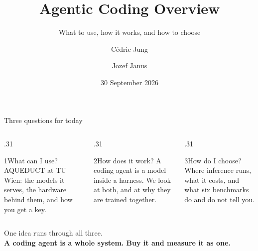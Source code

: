 \documentclass[aspectratio=169]{beamer}
\title{Agentic Coding Overview}
\subtitle{What to use, how it works, and how to choose}
\author{Cédric Jung \and Jozef Janus}
\date{30 September 2026}
\begin{document}
{%
\begin{frame}[plain]
  \titlepage
\end{frame}
}

\begin{frame}{Three questions for today}
\begin{columns}[T,onlytextwidth]
\begin{column}{.31\textwidth}
  \begin{block}{1\quad What can I use?}
  AQUEDUCT at TU Wien: the models it serves, the hardware behind them, and how you get a key.
  \end{block}
\end{column}
\hfill
\begin{column}{.31\textwidth}
  \begin{exampleblock}{2\quad How does it work?}
  A coding agent is a model inside a harness. We look at both, and at why they are trained together.
  \end{exampleblock}
\end{column}
\hfill
\begin{column}{.31\textwidth}
  \begin{block}{3\quad How do I choose?}
  Where inference runs, what it costs, and what six benchmarks do and do not tell you.
  \end{block}
\end{column}
\end{columns}
\vspace{9mm}
\centering One idea runs through all three.\\[1mm]
\textbf{A coding agent is a whole system. Buy it and measure it as one.}
\end{frame}
\end{document}
